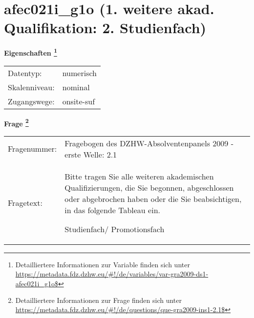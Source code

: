 
    \setcounter{footnote}{0}

    \vspace*{-1.8cm}
	\section{afec021i\_g1o (1. weitere akad. Qualifikation: 2. Studienfach)}
	\label{section:afec021i_g1o}



    \vspace*{0.5cm}
    \noindent\textbf{Eigenschaften
	\footnote{Detailliertere Informationen zur Variable finden sich unter
		\url{https://metadata.fdz.dzhw.eu/\#!/de/variables/var-gra2009-ds1-afec021i_g1o$}}}\\
	\begin{tabularx}{\hsize}{@{}lX}
	Datentyp: & numerisch \\
	Skalenniveau: & nominal \\
	Zugangswege: &
	  onsite-suf
 \\
    \end{tabularx}



				\vspace*{0.5cm}
                \noindent\textbf{Frage
	                \footnote{Detailliertere Informationen zur Frage finden sich unter
		              \url{https://metadata.fdz.dzhw.eu/\#!/de/questions/que-gra2009-ins1-2.1$}}}\\
				\begin{tabularx}{\hsize}{@{}lX}
					Fragenummer: &
					  Fragebogen des DZHW-Absolventenpanels 2009 - erste Welle:
					  2.1
 \\
					Fragetext: & Bitte tragen Sie alle weiteren akademischen Qualifizierungen, die Sie begonnen, abgeschlossen oder abgebrochen haben oder die Sie beabsichtigen, in das folgende Tableau ein.\par  Studienfach/ Promotionsfach \\
				\end{tabularx}





